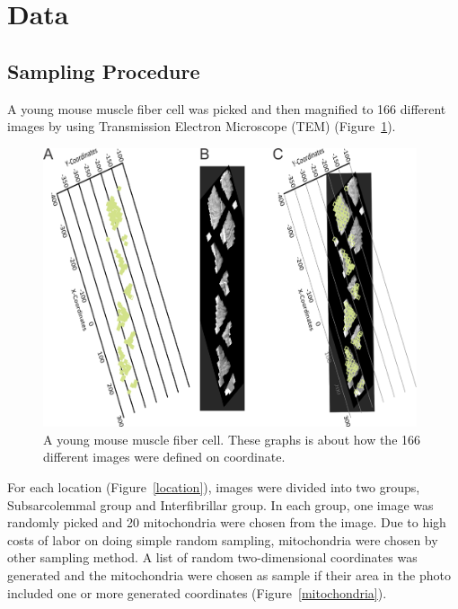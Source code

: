 \documentclass{article}\usepackage[]{graphicx}\usepackage[]{color}
\numberwithin{figure}{subsection} %
\numberwithin{table}{subsection} %
\begin{document}

\setcounter{section}{2} 
\setcounter{page}{8}

\section{Data}
\subsection{Sampling Procedure}

A young mouse muscle fiber cell was picked and then magnified to 166 different images by using Transmission Electron Microscope (TEM) (Figure~\ref{cell}). \\

\bigbreak
\begin{figure}[h!]
  \includegraphics [width=11cm, scale=1.5]{cell.png}
  \centering
  \caption{A young mouse muscle fiber cell. These graphs is about how the 166 different images were defined on coordinate.} 
  \label{cell}
\end{figure}


For each location (Figure~\ref{location}), images were divided into two groups, Subsarcolemmal group and Interfibrillar group. In each group, one image was randomly picked and 20 mitochondria were chosen from the image. Due to high costs of labor on doing simple random sampling, mitochondria were chosen by other sampling method. A list of random two-dimensional coordinates was generated and the mitochondria were chosen as sample if their area in the photo included one or more generated coordinates (Figure~\ref{mitochondria}). \\
\end{document}
